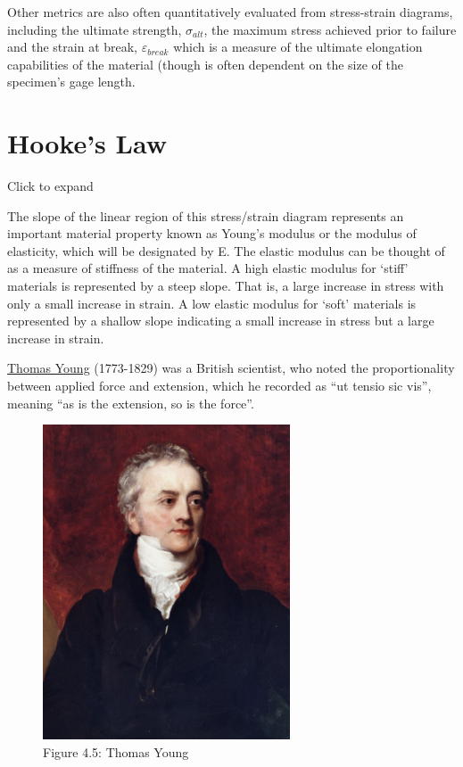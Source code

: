 \documentclass[
  letterpaper,
  DIV=11,
  numbers=noendperiod]{scrreprt}
\theoremstyle{definition}
\theoremstyle{remark}
\begin{document}
Other metrics are also often quantitatively evaluated from stress-strain
diagrams, including the ultimate strength, \(\sigma_{alt}\), the maximum
stress achieved prior to failure and the strain at break,
\(\varepsilon_{break}\) which is a measure of the ultimate elongation
capabilities of the material (though is often dependent on the size of
the specimen's gage length.

\section{Hooke's Law}\label{sec-4.3}

Click to expand

The slope of the linear region of this stress/strain diagram represents
an important material property known as Young's modulus or the modulus
of elasticity, which will be designated by E. The elastic modulus can be
thought of as a measure of stiffness of the material. A high elastic
modulus for `stiff' materials is represented by a steep slope. That is,
a large increase in stress with only a small increase in strain. A low
elastic modulus for `soft' materials is represented by a shallow slope
indicating a small increase in stress but a large increase in strain.

\href{https://en.wikipedia.org/wiki/Thomas_Young_(scientist)}{Thomas
Young} (1773-1829) was a British scientist, who noted the
proportionality between applied force and extension, which he recorded
as ``ut tensio sic vis'', meaning ``as is the extension, so is the
force''.

\begin{figure}[H]

{\centering \includegraphics[width=2.88542in,height=\textheight]{images/CH4 PNGs/4.5.jpeg}

}

\caption{Figure 4.5: Thomas Young}

\end{figure}%
\end{document}
